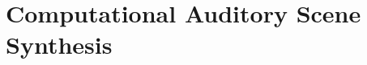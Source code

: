 \documentclass[a4paper,10pt,final]{ThesisStyle}
\begin{document}








\chapter{Computational Auditory Scene Synthesis}
\label{ch:synthesis-audio}
\minitoc


\end{document}
